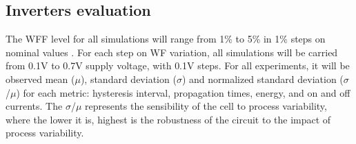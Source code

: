 \documentclass[pgmicro,mestrado,english]{iiufrgs}
\begin{document}
\begin{table}[]
\centering
\caption{Parameters applied in the electrical simulations}
\label{electPar}
\end{table}

\subsection{Inverters evaluation}
The WFF level for all simulations will range from 1\% to 5\% in 1\% steps on nominal values \cite{nawaz2014comparison}. For each step on WF variation, all simulations will be carried from 0.1V to 0.7V supply voltage, with 0.1V steps. For all experiments, it will be observed mean (\(\mu\)), standard deviation (\(\sigma\)) and normalized standard deviation (\(\sigma\)/\(\mu\)) for each metric: hysteresis interval, propagation times, energy, and on and off currents. The \(\sigma\)/\(\mu\) represents the sensibility of the cell to process variability, where the lower it is, highest is the robustness of the circuit to the impact of process variability. 
\end{document}
